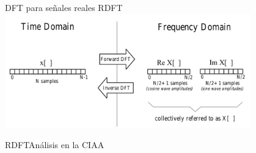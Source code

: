 \begin{frame}{DFT para señales reales RDFT}
   \protoboardicon
   \center\includegraphics[width=0.8\textwidth]{3_clase/real_dft_idft}
   \vfill
\end{frame}
\begin{frame}[c]{RDFT}{Análisis en la CIAA}
   \protoboardicon
   \begin{columns}[c]
      \hspace{2pt}
      \begin{column}{.5\textwidth}
         
      \end{column}
      \hspace{2pt}
      \vrule
      \hspace{2pt}
      \begin{column}{.5\textwidth}
         
      \end{column}
   \end{columns}
   \vfill
\end{frame}
